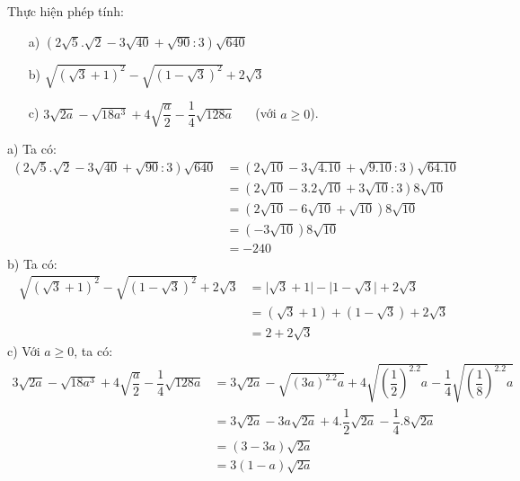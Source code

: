 \begin{ex}%
	Thực hiện phép tính:
	\begin{itemize}
	\item[a)] $\left(2\sqrt{5}.\sqrt{2}-3\sqrt{40}+\sqrt{90}:3\right)\sqrt{640}$
	\item[b)] $\sqrt{\left(\sqrt{3}+1\right)^2}-\sqrt{\left(1-\sqrt{3}\right)^2}+2\sqrt{3}$
	\item[c)] $3\sqrt{2a}-\sqrt{18a^3}+4\sqrt{\dfrac{a}{2}}-\dfrac{1}{4}\sqrt{128a}$ $\quad$ (với $a\geq 0$).
	\end{itemize}
	\loigiai
	{
	a) Ta có: \begin{align*}
	\left(2\sqrt{5}.\sqrt{2}-3\sqrt{40}+\sqrt{90}:3\right)\sqrt{640}&=\left(2\sqrt{10}-3\sqrt{4.10}+\sqrt{9.10}:3\right)\sqrt{64.10}\\
	&=\left(2\sqrt{10}-3.2\sqrt{10}+3\sqrt{10}:3\right)8\sqrt{10}\\
	&=\left(2\sqrt{10}-6\sqrt{10}+\sqrt{10}\right)8\sqrt{10}\\
	&=\left(-3\sqrt{10}\right)8\sqrt{10}\\
	&=-240
	\end{align*}
	b) Ta có:
	\begin{align*}
	\sqrt{\left(\sqrt{3}+1\right)^2}-\sqrt{\left(1-\sqrt{3}\right)^2}+2\sqrt{3}&=\big|\sqrt{3}+1\big|-\big|1-\sqrt{3}\big|+2\sqrt{3}\\
	&=\left(\sqrt{3}+1\right)+\left(1-\sqrt{3}\right)+2\sqrt{3}\\
	&=2+2\sqrt{3}
	\end{align*}
	c) Với $a\geq 0$, ta có:
	\begin{align*}
	3\sqrt{2a}-\sqrt{18a^3}+4\sqrt{\dfrac{a}{2}}-\dfrac{1}{4}\sqrt{128a}&=3\sqrt{2a}-\sqrt{(3a)^2.2a}+4\sqrt{\left(\dfrac{1}{2}\right)^2.2a}-\dfrac{1}{4}\sqrt{\left(\dfrac{1}{8}\right)^2.2a}\\
	&=3\sqrt{2a}-3a\sqrt{2a}+4.\dfrac{1}{2}\sqrt{2a}-\dfrac{1}{4}.8\sqrt{2a}\\
	&=(3-3a)\sqrt{2a}\\
	&=3(1-a)\sqrt{2a}
	\end{align*}
	}
\end{ex}
